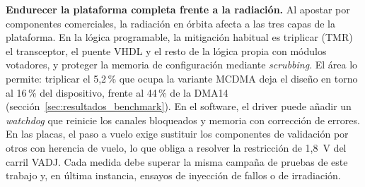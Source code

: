 \textbf{Endurecer la plataforma completa frente a la radiación.} Al apostar por componentes
comerciales, la radiación en órbita afecta a las tres capas de la plataforma. En la lógica
programable, la mitigación habitual es triplicar (TMR) el transceptor, el puente VHDL y el resto de
la lógica propia con módulos votadores, y proteger la memoria de configuración mediante
\textit{scrubbing}. El área lo permite: triplicar el 5,2\,\% que ocupa la variante MCDMA deja el
diseño en torno al 16\,\% del dispositivo, frente al 44\,\% de la DMA14
(sección~\ref{sec:resultados_benchmark}). En el software, el driver puede añadir un
\textit{watchdog} que reinicie los canales bloqueados y memoria con corrección de errores. En las
placas, el paso a vuelo exige sustituir los componentes de validación por otros con herencia de
vuelo, lo que obliga a resolver la restricción de 1,8~V del carril VADJ. Cada medida debe superar la misma campaña de pruebas de este trabajo y,
en última instancia, ensayos de inyección de fallos o de irradiación.
